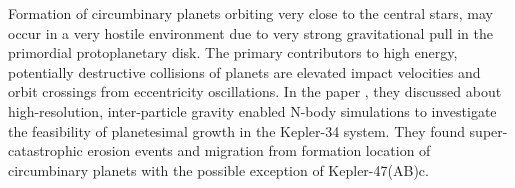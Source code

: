 Formation of circumbinary planets orbiting very close to the central stars, may occur in a very hostile environment due to very strong gravitational pull in the primordial protoplanetary disk.
The primary contributors to high energy, potentially destructive collisions of planets are elevated impact velocities and orbit crossings from eccentricity oscillations. 
In the paper \cite{Lines_2014}, they discussed about high-resolution, inter-particle gravity enabled N-body simulations to investigate the feasibility of planetesimal growth in the Kepler-34 system. 
They found super-catastrophic erosion events and  migration from formation location of circumbinary planets with the possible exception of Kepler-47(AB)c.
